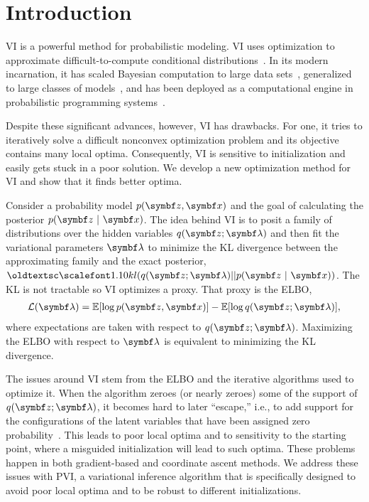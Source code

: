 \section{Introduction}
\label{sec:pvi-introduction}
\Gls{VI} is a powerful method for probabilistic modeling.  \gls{VI} uses optimization to approximate difficult-to-compute conditional distributions~\citep{jordan1999introduction}.  In its modern incarnation, it has scaled Bayesian computation to large data sets~\citep{hoffman2013stochastic}, generalized to large classes of models~\citep{kingma2014autoencoding,ranganath2014black,Rezende:2015}, and has been deployed as a computational engine in probabilistic programming systems~\citep{DBLP:journals/corr/MansinghkaSP14,Kucukelbir:2015,tran2016edward}.

Despite these significant advances, however, \gls{VI} has drawbacks. For one, it tries to iteratively solve a difficult nonconvex optimization problem and its objective contains many local optima. Consequently, \gls{VI} is sensitive to initialization and easily gets stuck in a poor solution.  We develop a new optimization method for \gls{VI} and show that it finds better optima.

Consider a probability model $p(\mbz,\mbx)$ and the goal of calculating the posterior $p(\mbz \mid \mbx)$. The idea behind \gls{VI} is to posit a family of distributions over the hidden variables $q(\mbz ; \mblambda)$ and then fit the variational parameters $\mblambda$ to minimize the \gls{KL} divergence between the approximating family and the exact posterior, $\textsc{kl}(q(\mbz ; \mblambda) || p(\mbz \mid \mbx))$. The \gls{KL} is not tractable so \gls{VI} optimizes a proxy.  That proxy is the
\gls{ELBO},
\begin{align}
\cL(\mblambda) = \E[\log p(\mbz,\mbx)] - \E[\log q(\mbz ; \mblambda)],
\label{eq:ELBO}
\end{align}
where expectations are taken with respect to $q(\mbz ; \mblambda)$. Maximizing the \gls{ELBO} with respect to $\mblambda$ is equivalent to minimizing the \gls{KL} divergence.

The issues around \gls{VI} stem from the \gls{ELBO} and the iterative algorithms used to optimize it. When the algorithm zeroes (or nearly zeroes) some of the support of $q(\mbz ; \mblambda)$, it becomes hard to later ``escape,'' i.e., to add support for the configurations of the latent variables that have been assigned zero probability~\citep{mackay2003information, Burda2016}. This leads to poor local optima and to sensitivity to the starting point, where a misguided initialization will lead to such optima. These problems happen in both gradient-based and coordinate ascent methods. We address these issues with  \gls{PVI}, a variational inference algorithm that is specifically designed to avoid poor local optima and to be robust to different initializations.

